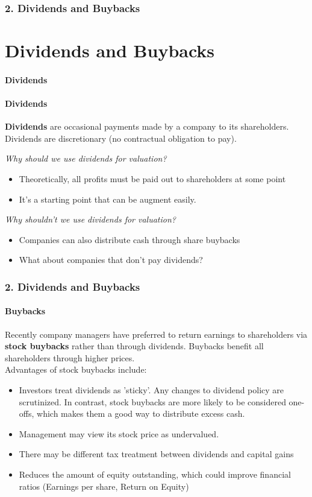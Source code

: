 \documentclass{beamer}
\begin{document}
\begin{frame}[t]
    \frametitle{2. Dividends and Buybacks}
    \section{Dividends and Buybacks}
    \framesubtitle{Dividends}

    \framesubtitle{Dividends}

    \textbf{Dividends} are occasional payments made by a company to its shareholders. 
    Dividends are discretionary (no contractual obligation to pay).\\
    \vspace{1em}

    \textit{Why should we use dividends for valuation?}
    \begin{itemize}
        \item Theoretically, all profits must be paid out to shareholders at some point
        \item It's a starting point that can be augment easily.
    \end{itemize}

    \textit{Why shouldn't we use dividends for valuation?}
    \begin{itemize}
        \item Companies can also distribute cash through share buybacks
        \item What about companies that don't pay dividends?
    \end{itemize}

\end{frame}

\begin{frame}[t]
    \frametitle{2. Dividends and Buybacks}
    \framesubtitle{Buybacks}

    Recently company managers have preferred to return earnings to shareholders 
    via \textbf{stock buybacks} rather than through dividends.  Buybacks benefit 
    all shareholders through higher prices.\\
    \vspace{1em}
    Advantages of stock buybacks include:
    \begin{itemize}
        \item Investors treat dividends as 'sticky'.  Any changes to dividend policy
        are scrutinized.   In contrast, stock buybacks are more likely to be considered 
        one-offs, which makes them a good way to distribute excess cash.
        \item Management may view its stock price as undervalued.
        \item There may be different tax treatment between dividends and capital gains
        \item Reduces the amount of equity outstanding, which could improve financial ratios (Earnings per share, Return on Equity)
    \end{itemize}

\end{frame}
\end{document}
